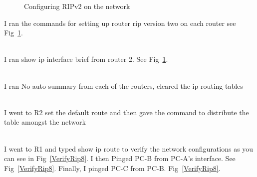 \documentclass[../EngineeringJournal_CDavis.tex]{subfiles}
\begin{document}
\newpage



\begin{figure}[!b]\centering
{}\hfill
{}\par 
\caption{Configuring RIPv2 on the network}
\label{ipbrief8}
\end{figure}

\noindent{}
I ran the commands for setting up router rip version two on each router see
Fig~\ref{ipbrief8}.
\hfill\break

\noindent{}
\\I ran show ip interface brief from router 2. See Fig~\ref{ipbrief8}.
\hfill\break

\noindent{}
\\I ran No auto-summary from each of the routers, cleared the ip routing tables
\hfill\break

\noindent{}
\\I went to R2 set the default route and then gave the command to distribute the table amongst the network
\hfill\break

\noindent{}
\\I went to R1 and typed show ip route to verify the network configurations as you can
see in Fig~\ref{VerifyRip8}.
\hfill\break
I then Pinged PC-B from PC-A's interface. See Fig~\ref{VerifyRip8}.
\hfill\break
Finally, I pinged PC-C from PC-B. Fig~\ref{VerifyRip8}.
\end{document}
